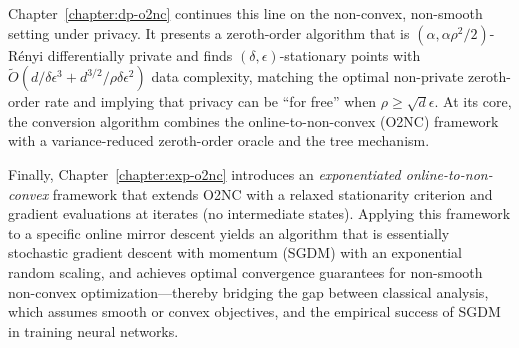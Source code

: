 Chapter~\ref{chapter:dp-o2nc} continues this line on the non-convex, non-smooth setting under privacy. It presents a zeroth-order algorithm that is $(\alpha,\alpha\rho^2/2)$-R\'enyi differentially private and finds $(\delta,\epsilon)$-stationary points with $\tilde O(d/\delta\epsilon^3 + d^{3/2}/\rho\delta\epsilon^2)$ data complexity, matching the optimal non-private zeroth-order rate and implying that privacy can be ``for free'' when $\rho \ge \sqrt{d}\epsilon$. At its core, the conversion algorithm combines the online-to-non-convex (O2NC) framework with a variance-reduced zeroth-order oracle and the tree mechanism.

Finally, Chapter~\ref{chapter:exp-o2nc} introduces an \emph{exponentiated online-to-non-convex} framework that extends O2NC with a relaxed stationarity criterion and gradient evaluations at iterates (no intermediate states). Applying this framework to a specific online mirror descent yields an algorithm that is essentially stochastic gradient descent with momentum (SGDM) with an exponential random scaling, and achieves optimal convergence guarantees for non-smooth non-convex optimization---thereby bridging the gap between classical analysis, which assumes smooth or convex objectives, and the empirical success of SGDM in training neural networks.